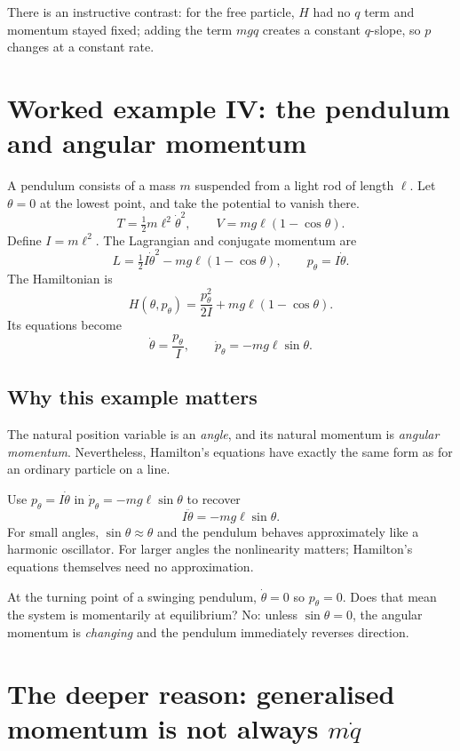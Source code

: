 \documentclass[11pt,a4paper,oneside]{article}
\begin{document}
There is an instructive contrast: for the free particle, $H$ had no $q$ term and momentum stayed fixed; adding the term $mgq$ creates a constant $q$-slope, so $p$ changes at a constant rate.

\section{Worked example IV: the pendulum and angular momentum}
A pendulum consists of a mass $m$ suspended from a light rod of length $\ell$. Let $\theta=0$ at the lowest point, and take the potential to vanish there.
\[
 T=\tfrac12m\ell^2\dot\theta^2,
\qquad V=mg\ell(1-\cos\theta).
\]
Define $I=m\ell^2$. The Lagrangian and conjugate momentum are
\[
 L=\tfrac12I\dot\theta^2-mg\ell(1-\cos\theta),
\qquad p_\theta=I\dot\theta.
\]
The Hamiltonian is
\begin{equation}\label{eq:pendH}
 \boxed{H(\theta,p_\theta)=\frac{p_\theta^2}{2I}+mg\ell(1-\cos\theta).}
\end{equation}
Its equations become
\begin{equation}\label{eq:pendpair}
 \boxed{\dot\theta=\frac{p_\theta}{I},\qquad
 \dot p_\theta=-mg\ell\sin\theta.}
\end{equation}

\subsection{Why this example matters}
The natural position variable is an \emph{angle}, and its natural momentum is \emph{angular momentum}. Nevertheless, Hamilton's equations have exactly the same form as for an ordinary particle on a line.

Use $p_\theta=I\dot\theta$ in $\dot p_\theta=-mg\ell\sin\theta$ to recover
\[
 I\ddot\theta=-mg\ell\sin\theta.
\]
For small angles, $\sin\theta\approx\theta$ and the pendulum behaves approximately like a harmonic oscillator. For larger angles the nonlinearity matters; Hamilton's equations themselves need no approximation.

\begin{pausebox}
At the turning point of a swinging pendulum, $\dot\theta=0$ so $p_\theta=0$. Does that mean the system is momentarily at equilibrium? No: unless $\sin\theta=0$, the angular momentum is \emph{changing} and the pendulum immediately reverses direction.
\end{pausebox}

\section{The deeper reason: generalised momentum is not always $m\dot q$}
\end{document}
